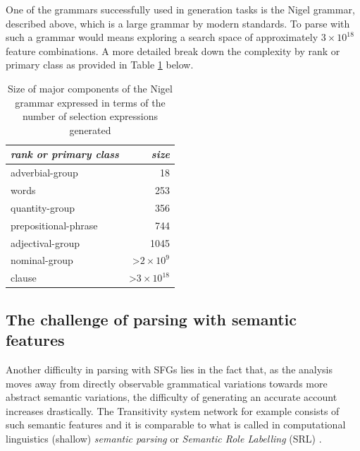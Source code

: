 One of the grammars successfully used in generation tasks is the Nigel grammar, described above, which is a large grammar by modern standards. 
To parse with such a grammar would means exploring a search space of approximately $3 \times 10^{18} $ feature combinations. A more detailed break down the complexity by rank or primary class as provided in Table \ref{tab:size} below.

\begin{table}[!ht]
    \centering
    \begin{tabular}{|l|r|}
        \hline
        \textit{rank or primary class} & \textit{size}                             \\ \hline
        adverbial-group                & 18                                        \\ \hline
        words                          & 253                                       \\ \hline
        quantity-group                 & 356                                       \\ \hline
        prepositional-phrase           & 744                                       \\ \hline
        adjectival-group               & 1045                                      \\ \hline
        nominal-group                  & \textgreater $ 2\times 10^{9} $  \\ \hline
        clause                         & \textgreater $ 3\times 10^{18} $ \\ \hline
    \end{tabular}
    \caption{Size of major components of the Nigel grammar expressed in terms of the number of selection expressions generated \citep[35]{Bateman2008}}
    \label{tab:size}
\end{table}

\subsection{The challenge of parsing with semantic features}

Another difficulty in parsing with SFGs lies in the fact that, as the analysis moves away from directly observable grammatical variations towards more abstract semantic variations, the difficulty of generating an accurate account increases drastically. The Transitivity system network for example consists of such semantic features and it is comparable to what is called in computational linguistics (shallow) \textit{semantic parsing} or \textit{Semantic Role Labelling} (SRL) \citep{Carreras2005}.

